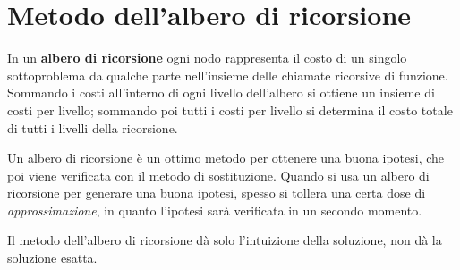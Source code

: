 \documentclass[10pt, a4paper]{report}
\begin{document}
\section{Metodo dell'albero di ricorsione}
In un \textbf{albero di ricorsione} ogni nodo rappresenta il costo di un singolo sottoproblema da qualche parte nell'insieme delle chiamate ricorsive di funzione. Sommando i costi all'interno di ogni livello dell'albero si ottiene un insieme di costi per livello; sommando poi tutti i costi per livello si determina il costo totale di tutti i livelli della ricorsione.

Un albero di ricorsione è un ottimo metodo per ottenere una buona ipotesi, che poi viene verificata con il metodo di sostituzione. Quando si usa un albero di ricorsione per generare una buona ipotesi, spesso si tollera una certa dose di \textsl{approssimazione}, in quanto l'ipotesi sarà verificata in un secondo momento.

Il metodo dell'albero di ricorsione dà solo l'intuizione della soluzione, non dà la soluzione esatta.
\end{document}
